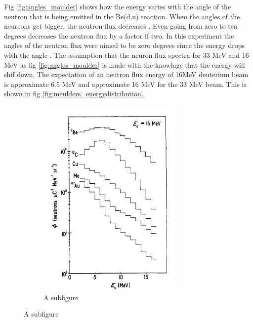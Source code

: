\documentclass[twoside,english]{uiofysmaster/uiofysmaster}
\begin{document}
Fig \ref{fig:angles_moulder} shows how the energy varies with the angle of the neutron that is being emitted in the Be(d,n) reaction. When the angles of the neureons get bigger, the neutron flux decreases \cite{Meulders}. Even going from zero to ten degrees decreases the neutron flux by a factor if two. In this experiment the angles of the neutron flux were aimed to be zero degrees since the energy drops with the angle \cite{Meulders}. The assumption that the neuron flux spectra for 33 MeV and 16 MeV as fig \ref{fig:angles_moulder} is made with the knowlage that the energy will shif down. The expectation of an neutron flux energy of 16MeV deuterium beam is approximate 6.5 MeV and approximate 16 MeV for the 33 MeV beam. This is shown in fig \ref{fig:meulders_energydistribution}.

\begin{figure} [h!]
	\centering
	\begin{subfigure}{.5\textwidth}
  		\centering
  		\includegraphics[width=.9\linewidth]{meulders_16.png}
  		\caption{A subfigure}
  		\label{fig:energy_16}

\end{subfigure}
\end{figure}
\end{document}
